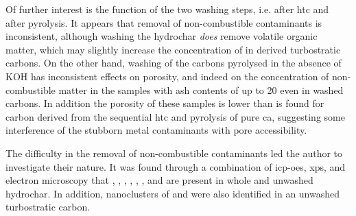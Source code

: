 Of further interest is the function of the two washing steps, i.e. after \gls{htc} and after pyrolysis. It appears that removal of non-combustible contaminants is inconsistent, although washing the \gls{hydrochar} \textit{does} remove volatile organic matter, which may slightly increase the concentration of  in derived turbostratic carbons. On the other hand, washing of the carbons pyrolysed in the absence of KOH has inconsistent effects on porosity, and indeed on the concentration of non-combustible matter in the samples with \glspl{ash content} of up to \qty{20}{\wtpercent} even in washed carbons. In addition the porosity of these samples is lower than is found for carbon derived from the sequential \gls{htc} and pyrolysis of pure \acrshort{ca}, suggesting some interference of the stubborn metal contaminants with pore accessibility.

The difficulty in the removal of non-combustible contaminants led the author to investigate their nature. It was found through a combination of \acrshort{icp-oes}, \acrshort{xps}, and electron microscopy that , , , , , , and  are present in whole  and unwashed \gls{hydrochar}. In addition, nanoclusters of  and  were also identified in an unwashed \gls{turbostratic carbon}. 


